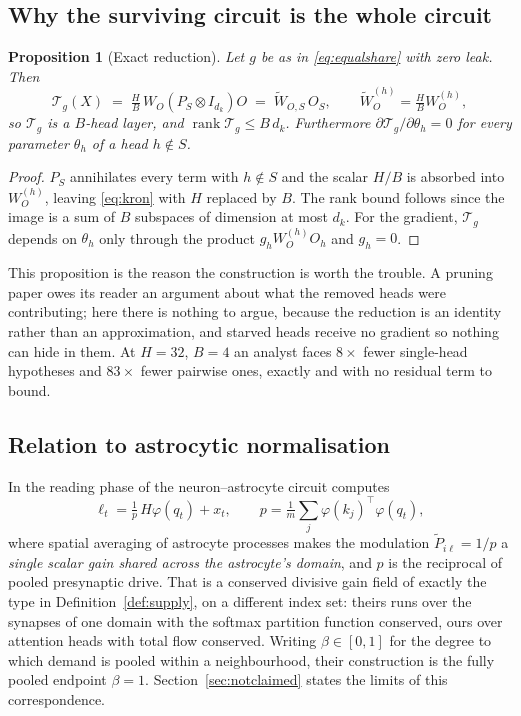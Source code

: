 \documentclass[11pt]{report}
\theoremstyle{plain}
\newtheorem{proposition}{Proposition}[chapter]
\theoremstyle{definition}
\theoremstyle{remark}
\begin{document}
\subsection{Why the surviving circuit is the whole circuit}

\begin{proposition}[Exact reduction]
\label{prop:reduction}
Let $g$ be as in \eqref{eq:equalshare} with zero leak. Then
\begin{equation}
  \mathcal{T}_g(X)
  \;=\; \tfrac{H}{B}\, W_O (P_S \otimes I_{d_k}) O
  \;=\; \widetilde{W}_{O,S}\, O_S,
  \qquad \widetilde{W}_{O}^{(h)} = \tfrac{H}{B} W_O^{(h)},
\end{equation}
so $\mathcal{T}_g$ \emph{is} a $B$-head layer, and $\operatorname{rank}\mathcal{T}_g \le
B\,d_k$. Furthermore $\partial\mathcal{T}_g/\partial\theta_h = 0$ for every parameter
$\theta_h$ of a head $h \notin S$.
\end{proposition}

\begin{proof}
$P_S$ annihilates every term with $h \notin S$ and the scalar $H/B$ is absorbed into
$W_O^{(h)}$, leaving \eqref{eq:kron} with $H$ replaced by $B$. The rank bound follows
since the image is a sum of $B$ subspaces of dimension at most $d_k$. For the gradient,
$\mathcal{T}_g$ depends on $\theta_h$ only through the product $g_h W_O^{(h)} O_h$ and
$g_h = 0$.
\end{proof}

This proposition is the reason the construction is worth the trouble. A pruning paper owes
its reader an argument about what the removed heads were contributing; here there is
nothing to argue, because the reduction is an identity rather than an approximation, and
starved heads receive no gradient so nothing can hide in them. At $H = 32$, $B = 4$ an
analyst faces $8\times$ fewer single-head hypotheses and $83\times$ fewer pairwise ones,
exactly and with no residual term to bound.

\subsection{Relation to astrocytic normalisation}

In \cite{kozachkov2023} the reading phase of the neuron--astrocyte circuit computes
\begin{equation}
  \ell_t = \tfrac{1}{p}\,H\varphi(q_t) + x_t,
  \qquad p = \tfrac{1}{m}\textstyle\sum_{j} \varphi(k_j)^\top \varphi(q_t),
\end{equation}
where spatial averaging of astrocyte processes makes the modulation
$\widetilde P_{i\ell} = 1/p$ a \emph{single scalar gain shared across the astrocyte's
domain}, and $p$ is the reciprocal of pooled presynaptic drive. That is a conserved
divisive gain field of exactly the type in Definition~\ref{def:supply}, on a different
index set: theirs runs over the synapses of one domain with the softmax partition
function conserved, ours over attention heads with total flow conserved. Writing
$\beta \in [0,1]$ for the degree to which demand is pooled within a neighbourhood, their
construction is the fully pooled endpoint $\beta = 1$. Section~\ref{sec:notclaimed}
states the limits of this correspondence.
\end{document}
